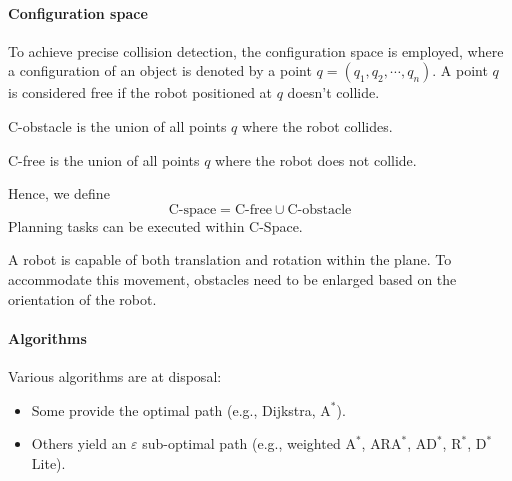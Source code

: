 \paragraph*{Configuration space}
To achieve precise collision detection, the configuration space is employed, where a configuration of an object is denoted by a point $q=(q_1,q_2,\cdots,q_n)$. 
A point $q$ is considered free if the robot positioned at $q$ doesn't collide. 
\begin{definition}
    C-obstacle is the union of all points $q$ where the robot collides.
\end{definition}
\begin{definition}
    C-free is the union of all points $q$ where the robot does not collide.
\end{definition}
Hence, we define
\[\text{C-space}=\text{C-free}\cup \text{C-obstacle}\]
Planning tasks can be executed within C-Space. 

A robot is capable of both translation and rotation within the plane. 
To accommodate this movement, obstacles need to be enlarged based on the orientation of the robot.

\paragraph*{Algorithms}
Various algorithms are at disposal:
\begin{itemize}
    \item Some provide the optimal path (e.g., Dijkstra, $\text{A}^\ast$).
    \item Others yield an $\varepsilon$ sub-optimal path (e.g., weighted $\text{A}^\ast$, $\text{ARA}^\ast$, $\text{AD}^\ast$, $\text{R}^\ast$, $\text{D}^\ast$ Lite).
\end{itemize}


